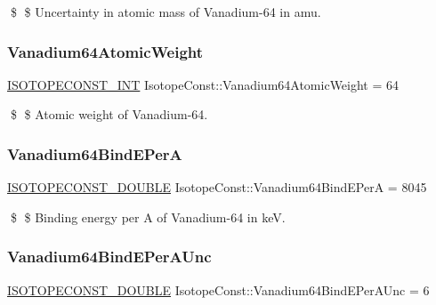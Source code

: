 \$ \$ Uncertainty in atomic mass of Vanadium-\/64 in amu. \mbox{\label{group___isotope_const-_vanadium-_v64_ga5ca6e07f32d3bd4a676526d1de71ed28}} 
\subsubsection{\texorpdfstring{Vanadium64\+Atomic\+Weight}{Vanadium64AtomicWeight}}
{\footnotesize\ttfamily \mbox{\hyperlink{group___isotope_const-_macros_ga5f18360b3e99483a35c32d789e62621c}{I\+S\+O\+T\+O\+P\+E\+C\+O\+N\+S\+T\+\_\+\+I\+NT}} Isotope\+Const\+::\+Vanadium64\+Atomic\+Weight = 64}

\$ \$ Atomic weight of Vanadium-\/64. \mbox{\label{group___isotope_const-_vanadium-_v64_ga81bb55fd54e5ecd3915b2482f042601c}} 
\subsubsection{\texorpdfstring{Vanadium64\+Bind\+E\+PerA}{Vanadium64BindEPerA}}
{\footnotesize\ttfamily \mbox{\hyperlink{group___isotope_const-_macros_ga8f45a7272ce02c0b4c65c44636ed719a}{I\+S\+O\+T\+O\+P\+E\+C\+O\+N\+S\+T\+\_\+\+D\+O\+U\+B\+LE}} Isotope\+Const\+::\+Vanadium64\+Bind\+E\+PerA = 8045}

\$ \$ Binding energy per A of Vanadium-\/64 in keV. \mbox{\label{group___isotope_const-_vanadium-_v64_ga6ce69d60a97bdf134add0449c64cbcd0}} 
\subsubsection{\texorpdfstring{Vanadium64\+Bind\+E\+Per\+A\+Unc}{Vanadium64BindEPerAUnc}}
{\footnotesize\ttfamily \mbox{\hyperlink{group___isotope_const-_macros_ga8f45a7272ce02c0b4c65c44636ed719a}{I\+S\+O\+T\+O\+P\+E\+C\+O\+N\+S\+T\+\_\+\+D\+O\+U\+B\+LE}} Isotope\+Const\+::\+Vanadium64\+Bind\+E\+Per\+A\+Unc = 6}

